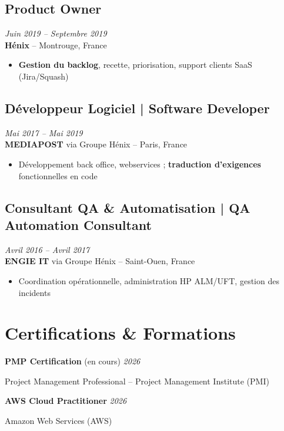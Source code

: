 \documentclass[11pt,a4paper]{article}
\begin{document}
\subsection*{Product Owner} \hfill \textit{Juin 2019 -- Septembre 2019}\\
\textbf{Hénix} -- Montrouge, France\\
\begin{itemize}
    \item \textbf{Gestion du backlog}, recette, priorisation, support clients SaaS (Jira/Squash)
\end{itemize}

\subsection*{Développeur Logiciel | Software Developer} \hfill \textit{Mai 2017 -- Mai 2019}\\
\textbf{MEDIAPOST} via Groupe Hénix -- Paris, France\\
\begin{itemize}
    \item Développement back office, webservices ; \textbf{traduction d'exigences} fonctionnelles en code
\end{itemize}

\subsection*{Consultant QA \& Automatisation | QA Automation Consultant} \hfill \textit{Avril 2016 -- Avril 2017}\\
\textbf{ENGIE IT} via Groupe Hénix -- Saint-Ouen, France\\
\begin{itemize}
    \item Coordination opérationnelle, administration HP ALM/UFT, gestion des incidents
\end{itemize}

\section*{Certifications \& Formations}

\textbf{PMP Certification} (en cours) \hfill \textit{2026}

Project Management Professional -- Project Management Institute (PMI)

\textbf{AWS Cloud Practitioner} \hfill \textit{2026}

Amazon Web Services (AWS)
\end{document}
